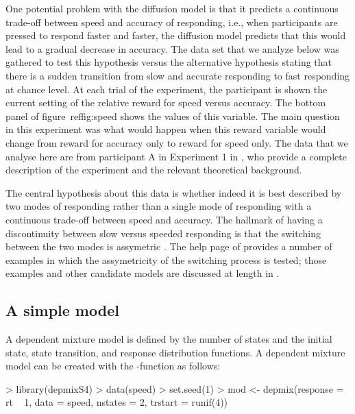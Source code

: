 \documentclass[article]{jss}
\begin{document}
One potential problem with the diffusion model is that it predicts a
continuous trade-off between speed and accuracy of responding, i.e.,
when participants are pressed to respond faster and faster, the
diffusion model predicts that this would lead to a gradual decrease in
accuracy.  The  data set that we analyze below was
gathered to test this hypothesis versus the alternative hypothesis
stating that there is a sudden transition from slow and accurate
responding to fast responding at chance level.  At each trial of the
experiment, the participant is shown the current setting of the
relative reward for speed versus accuracy.  The bottom panel of
figure~ref{fig:speed} shows the values of this variable.  The main
question in this experiment was what would happen when this reward
variable would change from reward for accuracy only to reward for
speed only.  The  data that we analyse here are from
participant A in Experiment 1 in \citet{Dutilh2009}, who provide a
complete description of the experiment and the relevant theoretical
background.

The central hypothesis about this data is whether indeed it is best
described by two modes of responding rather than a single mode of
responding with a continuous trade-off between speed and accuracy.
The hallmark of having a discontinuity between slow versus speeded
responding is that the switching between the two modes is assymetric
\citep[see e.g.][for a theoretical underpinning of this
claim]{Maas1992}.  The  help page of  provides
a number of examples in which the assymetricity of the switching
process is tested; those examples and other candidate models are
discussed at length in \citet{Visser2009b}.


\subsection{A simple model}

A dependent mixture model is defined by the number of states and the
initial state, state transition, and response distribution functions.
A dependent mixture model can be created with the
-function as follows:
\begin{Schunk}
\begin{Sinput}
> library(depmixS4)
> data(speed)
> set.seed(1)
> mod <- depmix(response = rt ~ 1, data = speed, nstates = 2, trstart = runif(4))
\end{Sinput}
\end{Schunk}
\end{document}
